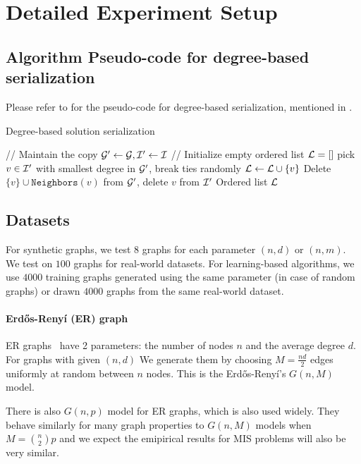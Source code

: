 \section{Detailed Experiment Setup}\label{sec:detail-exp-setup}
\subsection{Algorithm Pseudo-code for degree-based serialization}
Please refer to  for the pseudo-code for degree-based serialization, mentioned in .

\begin{algorithm}[!h]
\caption{Degree-based solution serialization}
\label{alg:serialization}
\begin{algorithmic}[1]
    \STATE // Maintain the copy
    \STATE ${\mathcal{G}}'\leftarrow{\mathcal{G}},{\mathcal{I}}'\leftarrow{\mathcal{I}}$ 
    \STATE // Initialize empty ordered list
    \STATE ${\mathcal{L}} = []$ 
        \STATE pick $v\in {\mathcal{I}}'$ with smallest degree in ${\mathcal{G}}'$, break ties randomly
        \STATE ${\mathcal{L}}\leftarrow {\mathcal{L}} \cup \{v\}$
        \STATE Delete $\{v\}\cup \texttt{Neighbors}(v)$ from ${\mathcal{G}}'$, delete $v$ from ${\mathcal{I}}'$
    \ENDWHILE
    \RETURN Ordered list ${\mathcal{L}}$
\end{algorithmic}
\end{algorithm}

\subsection{Datasets}
For synthetic graphs, we test $8$ graphs for each parameter $(n,d)$ or $(n,m)$. We test on $100$ graphs for real-world datasets. For learning-based algorithms, we use $4000$ training graphs generated using the same parameter (in case of random graphs) or drawn $4000$ graphs from the same real-world dataset.
\paragraph{Erd\H{o}s-Reny\'i (ER) graph}
ER graphs~\citep{erdos59a} have 2 parameters: the number of nodes $n$ and the average degree $d$. For graphs with given $(n,d)$ We generate them by choosing $M = \frac{nd}{2}$ edges uniformly at random between $n$ nodes. This is the Erd\H{o}s-Reny\'i's $G(n,M)$ model.

There is also $G(n,p)$ model for ER graphs, which is also used widely. They behave similarly for many graph properties to $G(n,M)$ models when $M = {n\choose 2} p$ and we expect the emipirical results for MIS problems will also be very similar.

